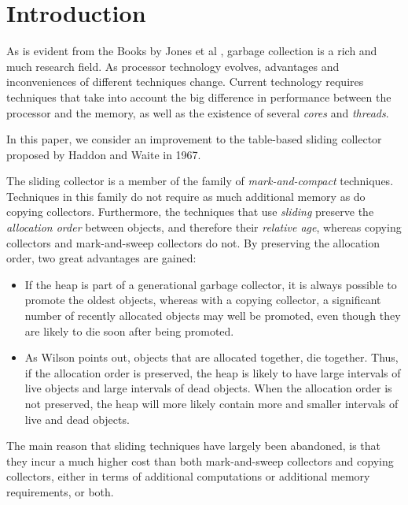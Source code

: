 \section{Introduction}

As is evident from the Books by Jones et al
\cite{Jones:2011:GCH:2025255} \cite{Jones:1996:GCA:236254}, garbage
collection is a rich and much research field.  As processor technology
evolves, advantages and inconveniences of different techniques
change.  Current technology requires techniques that take into account
the big difference in performance between the processor and the
memory, as well as the existence of several \emph{cores} and
\emph{threads}. 

In this paper, we consider an improvement to the table-based sliding
collector proposed by Haddon and Waite  in
1967.  

The sliding collector is a member of the family of
\emph{mark-and-compact} techniques.  Techniques in this family do not
require as much additional memory as do copying collectors.
Furthermore, the techniques that use \emph{sliding} preserve the
\emph{allocation order} between objects, and therefore their
\emph{relative age}, whereas copying collectors and mark-and-sweep
collectors do not.  By preserving the allocation order, two great
advantages are gained:

\begin{itemize}
\item If the heap is part of a generational garbage collector, it is
  always possible to promote the oldest objects, whereas with a
  copying collector, a significant number of recently allocated 
  objects may well be promoted, even though they are likely to die
  soon after being promoted. 
\item As Wilson \cite{Wilson:1992:UGC:645648.664824} points out,
  objects that are allocated together, die together.  Thus, if the
  allocation order is preserved, the heap is likely to have
  large intervals of live objects and large intervals of dead
  objects.  When the allocation order is not preserved, the heap will
  more likely contain more and smaller intervals of live and dead
  objects. 
\end{itemize}

The main reason that sliding techniques have largely been abandoned,
is that they incur a much higher cost than both mark-and-sweep
collectors and copying collectors, either in terms of additional
computations or additional memory requirements, or both. 
